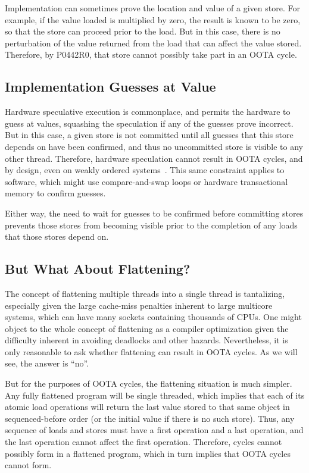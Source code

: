 \documentclass[10]{article}
\begin{document}
Implementation can sometimes prove the location and value of a given
store.
For example, if the value loaded is multiplied by zero, the result
is known to be zero, so that the store can proceed prior to the load.
But in this case, there is no perturbation of the value returned from
the load that can affect the value stored.
Therefore, by P0442R0, that store cannot possibly take part in an
OOTA cycle.

\subsection{Implementation Guesses at Value}
\label{sec:Implementation Guesses at Value}

Hardware speculative execution is commonplace, and permits the
hardware to guess at values, squashing the speculation if any
of the guesses prove incorrect.
But in this case, a given store is not committed until all guesses that
this store depends on have been confirmed, and thus no uncommitted store
is visible to any other thread.
Therefore, hardware speculation cannot result in OOTA cycles, and
by design, even on weakly ordered
systems~\cite{ARMv7A:2010,ARMv8A:2017,PowerISA2.07-2013}.
This same constraint applies to software, which might use compare-and-swap
loops or hardware transactional memory to confirm guesses.

Either way, the need to wait for guesses to be confirmed before committing
stores prevents those stores from becoming visible prior to the
completion of any loads that those stores depend on.

\subsection{But What About Flattening?}
\label{sec:But What About Flattening?}

The concept of flattening multiple threads into a single thread is
tantalizing, especially given the large cache-miss penalties inherent
to large multicore systems, which can have many sockets containing
thousands of CPUs.
One might object to the whole concept of flattening as a compiler
optimization given the difficulty inherent in avoiding deadlocks
and other hazards.
Nevertheless, it is only reasonable to ask whether flattening can
result in OOTA cycles.
As we will see, the answer is ``no''.

But for the purposes of OOTA cycles, the flattening situation is
much simpler.
Any fully flattened program will be single threaded, which implies that
each of its atomic load operations will return the last value stored to
that same object in sequenced-before order (or the initial value if there
is no such store).
Thus, any sequence of loads and stores must have a first operation and
a last operation, and the last operation cannot affect the first
operation.
Therefore, cycles cannot possibly form in a flattened program,
which in turn implies that OOTA cycles cannot form.
\end{document}
